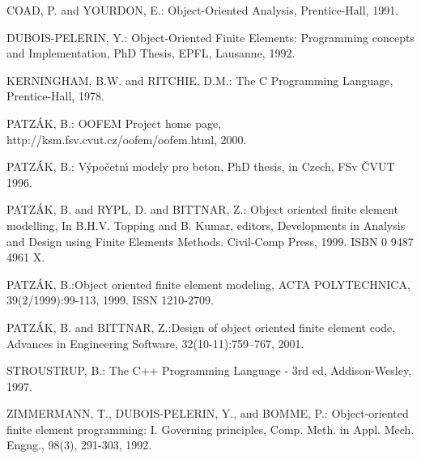 \documentclass[a4paper]{article}
\begin{document}
{}
\begin{thebibliography}{9}

COAD, P. and YOURDON, E.: {Object-Oriented Analysis,} Prentice-Hall,  1991.

DUBOIS-PELERIN, Y.: {Object-Oriented  Finite Elements:
Programming concepts and Implementation,} PhD Thesis, EPFL, Lausanne, 1992.

 KERNINGHAM, B.W. and RITCHIE, D.M.: {The C Programming
Language,} Prentice-Hall, 1978.

 PATZ\'{A}K, B.: {OOFEM Project home page,}
http://ksm.fsv.cvut.cz/oofem/oofem.html, 2000.

 PATZ\'{A}K, B.: {V\'{y}po\v{c}etn\'{\i} modely pro beton,} PhD
thesis, in Czech, FSv \v{C}VUT 1996. 

 PATZ\'{A}K, B. and RYPL, D. and BITTNAR, Z.: {Object
oriented finite element modelling,} In B.H.V. Topping and B. Kumar, editors,
Developments in Analysis and Design using Finite Elements
Methods. Civil-Comp Press, 1999. ISBN 0 9487 4961 X. 

 PATZ\'{A}K, B.:{Object oriented finite element modeling,} ACTA POLYTECHNICA, 39(2/1999):99-113, 1999. ISSN
1210-2709. 

 PATZ\'{A}K, B. and BITTNAR, Z.:{Design of object
oriented finite element code}, Advances in Engineering Software,
32(10-11):759--767, 2001. 

 STROUSTRUP, B.: {The C++ Programming Language - 3rd ed,}
Addison-Wesley, 1997.

 ZIMMERMANN, T., DUBOIS-PELERIN, Y., and BOMME, P.: {Object-oriented finite element programming: I. Governing principles,} Comp. Meth. in Appl. Mech. Engng., 98(3), 291-303, 1992. 
\end{thebibliography}
\end{document}
